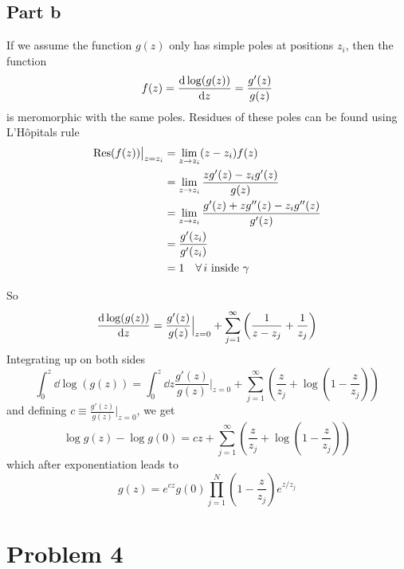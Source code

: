 \documentclass[a4paper,12pt]{article}
\begin{document}
\subsection*{Part b}
If we assume the function $g(z)$ only has simple poles at positions $z_i$, then the function
\begin{equation}
f(z)=\dv{\log(g(z))}{z}=\frac{g'(z)}{g(z)}
\end{equation}
is meromorphic with the same poles. Residues of these poles can be found using L'Hôpitals rule
\begin{equation}
	\begin{aligned}
\Res(f(z))\big|_{z=z_i}&=\lim_{z\to z_i}(z-z_i)f(z)\\
&=\lim_{z\to z_i}\frac{zg'(z)-z_ig'(z)}{g(z)}\\
&=\lim_{z\to z_i}\frac{g'(z)+zg''(z)-z_ig''(z)}{g'(z)}\\
&=\frac{g'(z_i)}{g'(z_i)}\\
&=1~~~\forall \,i \text{ inside $\gamma$ }
	\end{aligned}
\end{equation}

So 
\begin{equation}
\dv{\log(g(z))}{z}=\frac{g'(z)}{g(z)}\Big|_{z=0}+\sum_{j=1}^{\infty }\left(\frac{1}{z-z_j}+\frac{1}{z_j}\right)
\end{equation}
Integrating up on both sides
\begin{equation}
\int_0^z \dd\log(g(z))=\int_0^z \dd z\frac{g'(z)}{g(z)}\Big|_{z=0}+\sum_{j=1}^{\infty }\left(\frac{z}{z_j}+\log(1-\frac{z}{z_j})\right)
\end{equation}
and defining $c\equiv \frac{g'(z)}{g(z)}\Big|_{z=0}$, we get
\begin{equation}
\log g(z)-\log g(0)=cz+\sum_{j=1}^{\infty }\left(\frac{z}{z_j}+\log(1-\frac{z}{z_j})\right)
\end{equation}
which after exponentiation leads to
\begin{equation}
g(z)=e^{cz}g(0)\prod_{j=1}^{N}\left(1-\frac{z}{z_j}\right)e^{z/z_j}
\end{equation}
\section*{Problem 4}
\end{document}
